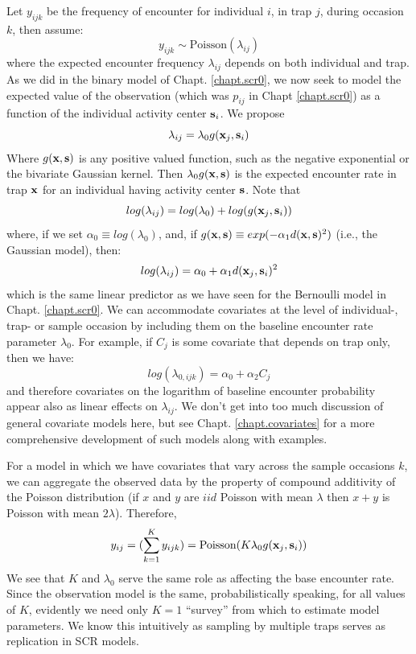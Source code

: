 Let $y_{ijk}$ be the frequency of encounter for
individual $i$, in trap $j$, during occasion $k$, then assume:
\[
 y_{ijk} \sim \mbox{Poisson}(\lambda_{ij})
\]
where the expected encounter frequency $\lambda_{ij}$ depends on both
individual and trap. As we did in the binary model of
Chapt. \ref{chapt.scr0}, we
now seek to model the expected value of the observation (which was
$p_{ij}$ in Chapt \ref{chapt.scr0}) as a function of the individual activity center
${\bf s}_{i}$.
We propose
\[
 \lambda_{ij} = \lambda_{0}  g({\bf x}_{j},{\bf s}_{i})
\]
Where $g({\bf x},{\bf s})$ is any positive valued function, such as
the negative exponential or the bivariate Gaussian kernel.
Then $\lambda_{0}g({\bf x},{\bf s})$ is the expected encounter rate in trap
${\bf x}$ for an individual having activity center ${\bf s}$.  Note
that
\[
 log(\lambda_{ij}) = log(\lambda_{0}) + log(  g({\bf x}_{j},{\bf
   s}_{i}) )
\]
where, if we set $\alpha_{0} \equiv log(\lambda_{0})$, and, if 
$g({\bf x},{\bf s}) \equiv exp(-\alpha_{1} d({\bf x},{\bf s})^2)$
(i.e., the Gaussian model), then:
\begin{equation}
 log(\lambda_{ij}) = \alpha_{0} + \alpha_{1} d({\bf x}_{j},{\bf s}_{i})^{2}
\label{poisson-mn.eq.lp}
\end{equation}
which is the same linear predictor as we have seen for the Bernoulli
model in Chapt. \ref{chapt.scr0}.  We can accommodate covariates at
the level of individual-, trap- or sample occasion by including them
on the baseline encounter rate parameter $\lambda_{0}$. For example,
if $C_{j}$ is some covariate that depends on trap only, then we have:
\[
log(\lambda_{0,ijk}) = \alpha_{0} + \alpha_{2} C_{j}
\]
and therefore covariates on the logarithm of baseline encounter
probability appear also as linear effects on $\lambda_{ij}$.  We don't
get into too much discussion of general covariate models here, but see
Chapt. \ref{chapt.covariates} for a more comprehensive development of
such models along with examples. 


For a  model in which we have covariates that vary across
the sample occasions  $k$, we can aggregate the observed data by the
property of compound additivity of the Poisson distribution (if $x$ and
$y$ are $iid$ Poisson with mean $\lambda$ then $x+y$ is Poisson with
mean $2\lambda$). Therefore,
\[
y_{ij} = (\sum_{k=1}^{K} y_{ijk}) =  \mbox{Poisson}(K  \lambda_{0}
g({\bf x}_{j},{\bf s}_{i}) )
\]
We see that $K$ and $\lambda_{0}$ serve the same role as affecting the
base encounter rate. Since the observation model is the same,
probabilistically speaking, for all values of $K$, evidently we need
only $K=1$ ``survey'' from which to estimate model parameters. We know
this intuitively as sampling by multiple traps serves as replication
in SCR models.

